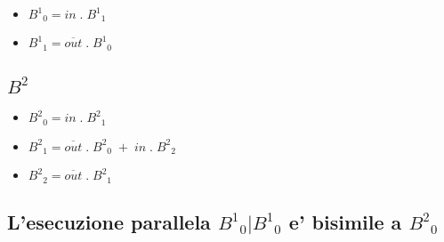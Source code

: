 \begin{itemize}
  \item ${B^1}_0 = in \; . \; {B^1}_1$
  \item ${B^1}_1 = \overline {out} \; . \; {B^1}_0$
\end{itemize}


\subsection{${B^2}$}

\begin{itemize}
  \item ${B^2}_0 = in \; . \; {B^2}_1$
  \item ${B^2}_1 = \overline {out} \; . \; {B^2}_0 \; + \; in \; . \; {B^2}_2$
  \item ${B^2}_2 = \overline {out} \; . \; {B^2}_1$
\end{itemize}


\subsection{L'esecuzione parallela ${B^1}_0 | {B^1}_0$ e' bisimile a ${B^2}_0$}

